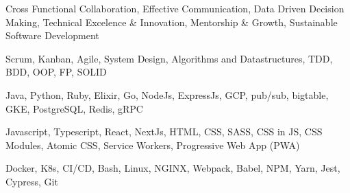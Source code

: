

{Cross Functional Collaboration, Effective Communication, Data Driven Decision Making, Technical Excelence \& Innovation, Mentorship \& Growth, Sustainable Software Development}

{Scrum, Kanban, Agile, System Design, Algorithms and Datastructures, TDD, BDD, OOP, FP, SOLID}

{Java, Python, Ruby, Elixir, Go, NodeJs, ExpressJs, GCP, pub/sub, bigtable, GKE, PostgreSQL, Redis, gRPC}

{Javascript, Typescript, React, NextJs, HTML, CSS, SASS, CSS in JS, CSS Modules, Atomic CSS, Service Workers, Progressive Web App (PWA)}

{Docker, K8s, CI/CD, Bash, Linux, NGINX, Webpack, Babel, NPM, Yarn, Jest, Cypress, Git}

\medskip

